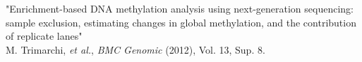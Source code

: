 "Enrichment-based DNA methylation analysis using next-generation sequencing:
sample exclusion, estimating changes in global methylation, and the contribution of replicate lanes" \\
\small{M. Trimarchi, \textit{et al.}, \textit{BMC Genomic} (2012), Vol. 13, Sup. 8.} \\
